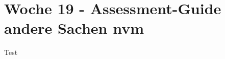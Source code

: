 \section{Woche 19 - Assessment-Guide \headerand andere Sachen nvm} \label{sec:bericht-wo-19}



Test
